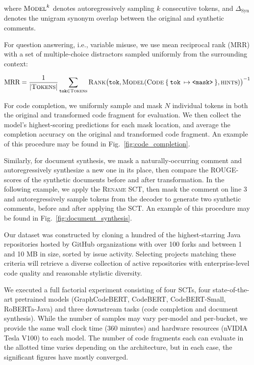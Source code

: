 \documentclass[usenames,dvipsnames]{article} %
\begin{document}
  where $\textsc{Model}^{k}$ denotes autoregressively sampling $k$ consecutive tokens, and $\Delta_\text{Syn}$ denotes the unigram synonym overlap between the original and synthetic comments.

  For question answering, i.e., variable misuse, we use mean reciprocal rank (MRR) with a set of multiple-choice distractors sampled uniformly from the surrounding context:

  \begin{equation*}
    \text{MRR} = \frac{1}{|\textsc{Tokens}|} \sum_{\texttt{tok}\in\textsc{Tokens}} \textsc{Rank}\big(\texttt{tok}, \textsc{Model}(\textsc{Code}\:\{\:\texttt{tok}\:\mapsto\texttt{<mask>}\:\}, \textsc{hints})\big)^{-1}
  \end{equation*}

  For code completion, we uniformly sample and mask $N$ individual tokens in both the original and transformed code fragment for evaluation. We then collect the model's highest-scoring predictions for each mask location, and average the completion accuracy on the original and transformed code fragment. An example of this procedure may be found in Fig.~\ref{fig:code_completion}.


  Similarly, for document synthesis, we mask a naturally-occurring comment and autoregressively synthesize a new one in its place, then compare the ROUGE-scores of the synthetic documents before and after transformation. In the following example, we apply the \textsc{Rename} SCT, then mask the comment on line 3 and autoregressively sample tokens from the decoder to generate two synthetic comments, before and after applying the SCT. An example of this procedure may be found in Fig.~\ref{fig:document_synthesis}.


  Our dataset was constructed by cloning a hundred of the highest-starring Java repositories hosted by GitHub organizations with over 100 forks and between 1 and 10 MB in size, sorted by issue activity. Selecting projects matching these criteria will retrieve a diverse collection of active repositories with enterprise-level code quality and reasonable stylistic diversity.

  We executed a full factorial experiment consisting of four SCTs, four state-of-the-art pretrained models (GraphCodeBERT, CodeBERT, CodeBERT-Small, RoBERTa-Java) and three downstream tasks (code completion and document synthesis). While the number of samples may vary per-model and per-bucket, we provide the same wall clock time (360 minutes) and hardware resources (nVIDIA Tesla V100) to each model. The number of code fragments each can evaluate in the allotted time varies depending on the architecture, but in each case, the significant figures have mostly converged.
\end{document}
